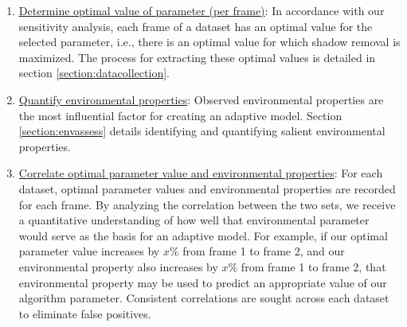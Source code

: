 \begin{enumerate}


\item \underline{Determine optimal value of parameter (per frame)}: In accordance with our sensitivity analysis, each frame of a dataset has an optimal value for the selected parameter, i.e., there is an optimal value for which shadow removal is maximized. The process for extracting these optimal values is detailed in section \ref{section:datacollection}.

\item \underline{Quantify environmental properties}: Observed environmental properties are the most influential factor for creating an adaptive model. Section \ref{section:envassess} details identifying and quantifying salient environmental properties. 


\item \underline{Correlate optimal parameter value and environmental properties}: For each dataset, optimal parameter values and environmental properties are recorded for each frame. By analyzing the correlation between the two sets, we receive a quantitative understanding of how well that environmental parameter would serve as the basis for an adaptive model. For example, if our optimal parameter value increases by $x\%$ from frame 1 to frame 2, and our environmental property also increases by $x\%$ from frame 1 to frame 2, that environmental property may be used to predict an appropriate value of our algorithm parameter. Consistent correlations are sought across each dataset to eliminate false positives.


\end{enumerate}
